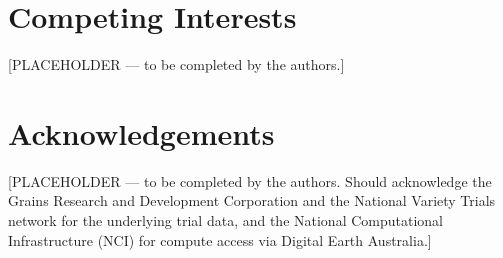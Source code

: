 \section*{Competing Interests}\label{competing-interests}

{[}PLACEHOLDER --- to be completed by the authors.{]}

\section*{Acknowledgements}\label{acknowledgements}

{[}PLACEHOLDER --- to be completed by the authors. Should acknowledge the Grains Research and Development Corporation and the National Variety Trials network for the underlying trial data, and the National Computational Infrastructure (NCI) for compute access via Digital Earth Australia.{]}
